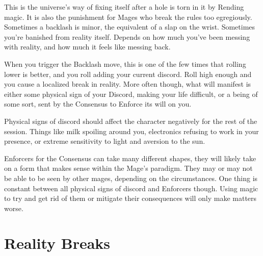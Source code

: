 \documentclass[
  oneside,
  statementpaper,
  9pt]{memoir}
\begin{document}
\begin{Player}

This is the universe’s way of fixing itself after a hole is torn in it by Rending magic. It is also the punishment for Mages who break the rules too egregiously. Sometimes a backlash is minor, the equivalent of a slap on the wrist. Sometimes you’re banished from reality itself. Depends on how much you’ve been messing with reality, and how much it feels like messing back.

When you trigger the Backlash move, this is one of the few times that rolling lower is better, and you roll adding your current discord. Roll high enough and you cause a localized break in reality. More often though, what will manifest is either some physical sign of your Discord, making your life difficult, or a being of some sort, sent by the Consensus to Enforce its will on you. 

Physical signs of discord should affect the character negatively for the rest of the session. Things like milk spoiling around you, electronics refusing to work in your presence, or extreme sensitivity to light and aversion to the sun. 

Enforcers for the Consensus can take many different shapes, they will likely take on a form that makes sense within the Mage’s paradigm. They may or may not be able to be seen by other mages, depending on the circumstances. One thing is constant between all physical signs of discord and Enforcers though. Using magic to try and get rid of them or mitigate their consequences will only make matters worse.

\end{Player}

\hypertarget{reality-breaks}{%
\section{Reality Breaks}\label{reality-breaks}}
\end{document}

